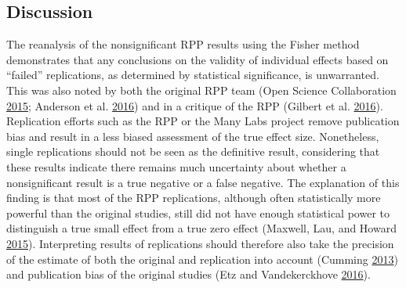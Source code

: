 \documentclass[a5paper]{book}
\begin{document}
\subsection{Discussion}\label{discussion-3}

The reanalysis of the nonsignificant RPP results using the Fisher method
demonstrates that any conclusions on the validity of individual effects
based on \enquote{failed} replications, as determined by statistical
significance, is unwarranted. This was also noted by both the original
RPP team (Open Science Collaboration
\protect\hyperlink{ref-doi:10.1126ux2fscience.aac4716}{2015}; Anderson
et al. \protect\hyperlink{ref-doi:10.1126ux2fscience.aad9163}{2016}) and
in a critique of the RPP (Gilbert et al.
\protect\hyperlink{ref-doi:10.1126ux2fscience.aad7243}{2016}).
Replication efforts such as the RPP or the Many Labs project remove
publication bias and result in a less biased assessment of the true
effect size. Nonetheless, single replications should not be seen as the
definitive result, considering that these results indicate there remains
much uncertainty about whether a nonsignificant result is a true
negative or a false negative. The explanation of this finding is that
most of the RPP replications, although often statistically more powerful
than the original studies, still did not have enough statistical power
to distinguish a true small effect from a true zero effect (Maxwell,
Lau, and Howard \protect\hyperlink{ref-doi:10.1037ux2fa0039400}{2015}).
Interpreting results of replications should therefore also take the
precision of the estimate of both the original and replication into
account (Cumming
\protect\hyperlink{ref-doi:10.1177ux2f0956797613504966}{2013}) and
publication bias of the original studies (Etz and Vandekerckhove
\protect\hyperlink{ref-doi:10.1371ux2fjournal.pone.0149794}{2016}).
\end{document}
